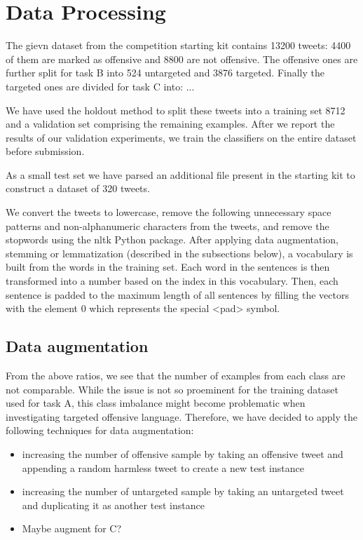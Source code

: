 \documentclass[11pt,a4paper]{article}
\begin{document}

\section{Data Processing}


The gievn dataset from the competition starting kit contains 13200 tweets: 4400 of them are marked as offensive and 8800 are not offensive. The offensive ones are further split for task B into 524 untargeted and 3876 targeted. Finally the targeted ones are divided for task C into: ...

We have used the holdout method to split these tweets into a training set 8712 and a validation set comprising the remaining examples. After we report the results of our validation experiments, we train the classifiers on the entire dataset before submission.

As a small test set we have parsed an additional file present in the starting kit to construct a dataset of 320 tweets.

We convert the tweets to lowercase, remove the following unnecessary space patterns and non-alphanumeric characters from the tweets, and remove the stopwords using the nltk Python package. After applying data augmentation, stemming or lemmatization (described in the subsections below), a vocabulary is built from the words in the training set. Each word in the sentences is then transformed into a number based on the index in this vocabulary. Then, each sentence is padded to the maximum length of all sentences by filling the vectors with the element 0 which represents the special <pad> symbol.

\subsection{Data augmentation}

From the above ratios, we see that the number of examples from each class are not comparable. While the issue is not so proeminent for the training dataset used for task A, this class imbalance might become problematic when investigating targeted offensive language. Therefore, we have decided to apply the following techniques for data augmentation:
\begin{itemize}
    \item increasing the number of offensive sample by taking an offensive tweet and appending a random harmless tweet to create a new test instance
    \item increasing the number of untargeted sample by taking an untargeted tweet and duplicating it as another test instance
    \item Maybe augment for C?
\end{itemize}
\end{document}
